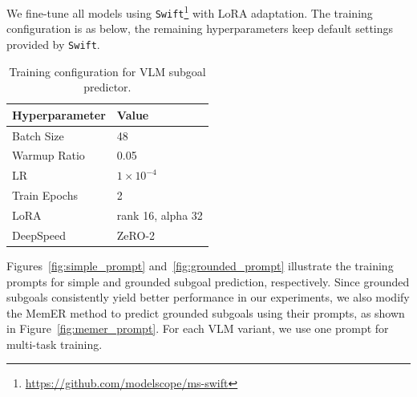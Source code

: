 We fine-tune all models using \texttt{Swift}\footnote{\url{https://github.com/modelscope/ms-swift}} with LoRA adaptation. The training configuration is as below, the remaining hyperparameters keep default settings provided by \texttt{Swift}.
\begin{table}[h]
\centering
\caption{Training configuration for VLM subgoal predictor.}
\label{tab:train_hparams_vlm}
\small
\begin{tabular}{ll}
\toprule
\textbf{Hyperparameter} & \textbf{Value} \\
\midrule
Batch Size  & 48 \\
Warmup Ratio & 0.05 \\
LR & $1\times 10^{-4}$ \\
Train Epochs & 2 \\
LoRA & rank 16, alpha 32 \\
DeepSpeed & ZeRO-2 \\
\bottomrule
\end{tabular}
\end{table}

Figures~\ref{fig:simple_prompt} and~\ref{fig:grounded_prompt} illustrate the training prompts for simple and grounded subgoal prediction, respectively. Since grounded subgoals consistently yield better performance in our experiments, we also modify the MemER\cite{sridhar2025memer} method to predict grounded subgoals using their prompts, as shown in Figure~\ref{fig:memer_prompt}. For each VLM variant, we  use one prompt for multi-task training.



